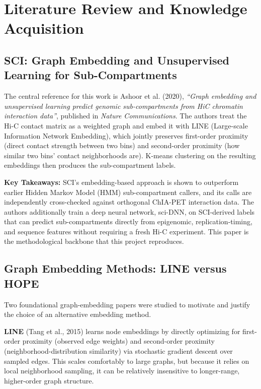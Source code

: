 \documentclass[12pt]{article}
\begin{document}
\section{Literature Review and Knowledge Acquisition}

\subsection{SCI: Graph Embedding and Unsupervised Learning for Sub-Compartments}
The central reference for this work is Ashoor et al. (2020), \textit{``Graph embedding and
unsupervised learning predict genomic sub-compartments from HiC chromatin interaction data''},
published in \textit{Nature Communications}. The authors treat the Hi-C contact matrix as a
weighted graph and embed it with LINE (Large-scale Information Network Embedding), which jointly
preserves first-order proximity (direct contact strength between two bins) and second-order
proximity (how similar two bins' contact neighborhoods are). K-means clustering on the resulting
embeddings then produces the sub-compartment labels.

\textbf{Key Takeaways:} SCI's embedding-based approach is shown to outperform earlier Hidden
Markov Model (HMM) sub-compartment callers, and its calls are independently cross-checked
against orthogonal ChIA-PET interaction data. The authors additionally train a deep neural
network, sci-DNN, on SCI-derived labels that can predict sub-compartments directly from
epigenomic, replication-timing, and sequence features without requiring a fresh Hi-C experiment.
This paper is the methodological backbone that this project reproduces.

\subsection{Graph Embedding Methods: LINE versus HOPE}
Two foundational graph-embedding papers were studied to motivate and justify the choice of an
alternative embedding method.

\textbf{LINE} (Tang et al., 2015) learns node embeddings by directly optimizing for first-order
proximity (observed edge weights) and second-order proximity (neighborhood-distribution
similarity) via stochastic gradient descent over sampled edges. This scales comfortably to large
graphs, but because it relies on local neighborhood sampling, it can be relatively insensitive to
longer-range, higher-order graph structure.
\end{document}

